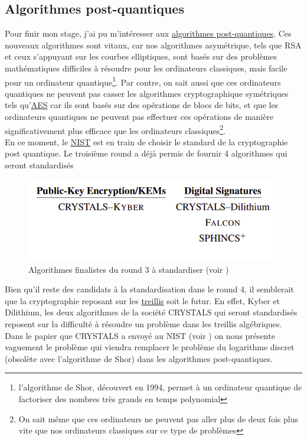 \documentclass[a4paper, 12pt]{article}
\begin{document}
\subsection{Algorithmes post-quantiques}
Pour finir mon stage, j'ai pu m'intéresser aux \hyperref[postquant]{algorithmes post-quantiques}. Ces nouveaux algorithmes sont vitaux, car nos algorithmes asymétrique, tels que RSA et ceux s'appuyant sur les courbes elliptiques, sont basés sur des problèmes mathématiques difficiles à résoudre pour les ordinateurs classiques, mais facile pour un ordinateur quantique\footnote{l'algorithme de Shor, découvert en 1994, permet à un ordinateur quantique de factoriser des nombres très grands en temps polynomial}. Par contre, on sait aussi que ces ordinateurs quantiques ne peuvent pas casser les algorithmes cryptographique symétriques tels qu'\hyperref[AESsec]{AES} car ils sont basés sur des opérations de blocs de bits, et que les ordinateurs quantiques ne peuvent pas effectuer ces opérations de manière significativement plus efficace que les ordinateurs classiques\footnote{On sait même que ces ordinateurs ne peuvent pas aller plus de deux fois plus vite que nos ordinateurs classiques sur ce type de problèmes}. \\

En ce moment, le \hyperref[NIST]{NIST} est en train de choisir le standard de la cryptographie post quantique. Le troisième round a déjà permis de fournir 4 algorithmes qui seront standardisés 
\begin{figure}[h]
	\centering
	\includegraphics[width=.7\textwidth]{img/NISTround3.png}
	\caption{Algorithmes finalistes du round 3 à standardiser (voir \cite{NISTroundtrois})}
	\label{NISTround3}
\end{figure}

Bien qu'il reste des candidats à la standardisation dans le round 4, il semblerait que la cryptographie reposant sur les \hyperref[treillis]{treillis} soit le futur. En effet, Kyber et Dilithium, les deux algorithmes de la société CRYSTALS qui seront standardisés reposent sur la difficulté à résoudre un problème dans les treillis algébriques.\\

Dans le papier que CRYSTALS a envoyé au NIST (voir \cite{cristalslattice}) on nous présente vaguement le problème qui viendra remplacer le problème du logarithme discret (obsolète avec l'algorithme de Shor) dans les algorithmes post-quantiques. \\
\end{document}
